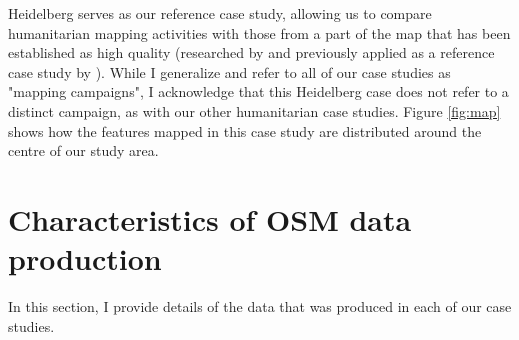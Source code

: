 Heidelberg serves as our reference case study, allowing us to compare humanitarian mapping activities with those from a part of the map that has been established as high quality (researched by \textcite{arsanjani_assessing_2013} and previously applied as a reference case study by \textcite{anderson_crowd_2018}). While I generalize and refer to all of our case studies as "mapping campaigns", I acknowledge that this Heidelberg case does not refer to a distinct campaign, as with our other humanitarian case studies. Figure \ref{fig:map} shows how the features mapped in this case study are distributed around the centre of our study area.

\section{Characteristics of OSM data production}

In this section, I provide details of the data that was produced in each of our case studies.

